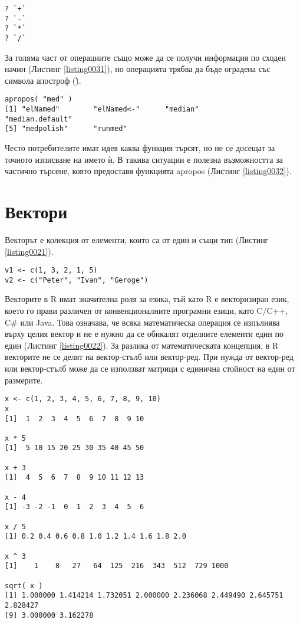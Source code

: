 \begin{lstlisting}[caption=Документация за операции, label=listing0031]
? `+`
? `-`
? `*`
? `/`
\end{lstlisting}

За голяма част от операциите също може да се получи информация по сходен начин (Листинг \ref{listing0031}), но операцията трябва да бъде оградена със символа апостроф (\`).

\begin{lstlisting}[caption=Частично търсене, label=listing0032]
apropos( "med" )
[1] "elNamed"        "elNamed<-"      "median"         "median.default"
[5] "medpolish"      "runmed"
\end{lstlisting}

Често потребителите имат идея каква функция търсят, но не се досещат за точното изписване на името ѝ. В такива ситуации е полезна възможността за частично търсене, която предоставя функцията apropos (Листинг \ref{listing0032}).

\section{Вектори}

Векторът е колекция от елементи, които са от един и същи тип (Листинг \ref{listing0021}). 

\begin{lstlisting}[caption=Вектор от числа и вектор от символни низове, label=listing0021]
v1 <- c(1, 3, 2, 1, 5)
v2 <- c("Peter", "Ivan", "Geroge")
\end{lstlisting}

Векторите в R имат значителна роля за езика, тъй като R е векторизиран език, което го прави различен от конвенционалните програмни езици, като C/C++, C\# или Java. Това означава, че всяка математическа операция се изпълнява върху целия вектор и не е нужно да се обикалят отделните елементи един по един (Листинг \ref{listing0022}). За разлика от математическата концепция, в R векторите не се делят на вектор-стълб или вектор-ред. При нужда от вектор-ред или вектор-стълб може да се използват матрици с единична стойност на един от размерите.

\begin{lstlisting}[caption=Базови операции над вектори, label=listing0022]
x <- c(1, 2, 3, 4, 5, 6, 7, 8, 9, 10)
x
[1]  1  2  3  4  5  6  7  8  9 10

x * 5
[1]  5 10 15 20 25 30 35 40 45 50

x + 3
[1]  4  5  6  7  8  9 10 11 12 13

x - 4
[1] -3 -2 -1  0  1  2  3  4  5  6

x / 5
[1] 0.2 0.4 0.6 0.8 1.0 1.2 1.4 1.6 1.8 2.0

x ^ 3
[1]    1    8   27   64  125  216  343  512  729 1000

sqrt( x )
[1] 1.000000 1.414214 1.732051 2.000000 2.236068 2.449490 2.645751 2.828427
[9] 3.000000 3.162278
\end{lstlisting}

